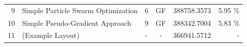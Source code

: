 \begin{table}[htbp]
\begin{center}
\begin{tabular}{r l l c r r}
					9       & Simple Particle Swarm Optimization				& 6     & GF	& 388758.3573	&	5.95 \% 	\\ %
					10      & Simple Pseudo-Gradient Approach					& 9     & GF	& 388342.7004	&	5.83 \% 	\\ %
					11		& (Example Layout)									& -		& -		& 366941.5712	&	- 			\\ %
					\hline
				\end{tabular}
			\end{center}



\end{table}
